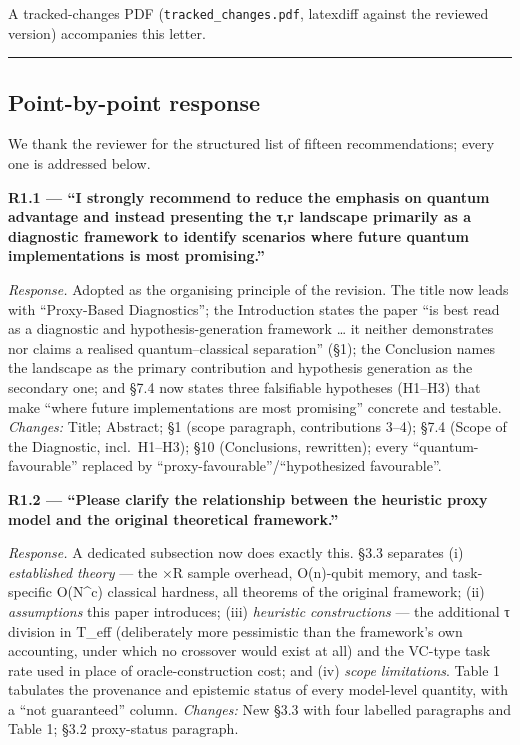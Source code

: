 \documentclass[
  11pt,
]{article}
\begin{document}
A tracked-changes PDF (\texttt{tracked\_changes.pdf}, latexdiff against
the reviewed version) accompanies this letter.

\begin{center}\rule{0.5\linewidth}{0.5pt}\end{center}

\subsection{Point-by-point response}\label{point-by-point-response}

We thank the reviewer for the structured list of fifteen
recommendations; every one is addressed below.

\textbf{R1.1 --- ``I strongly recommend to reduce the emphasis on
quantum advantage and instead presenting the τ,r landscape primarily as
a diagnostic framework to identify scenarios where future quantum
implementations is most promising.''}

\emph{Response.} Adopted as the organising principle of the revision.
The title now leads with ``Proxy-Based Diagnostics''; the Introduction
states the paper ``is best read as a diagnostic and
hypothesis-generation framework \ldots{} it neither demonstrates nor
claims a realised quantum--classical separation'' (§1); the Conclusion
names the landscape as the primary contribution and hypothesis
generation as the secondary one; and §7.4 now states three falsifiable
hypotheses (H1--H3) that make ``where future implementations are most
promising'' concrete and testable. \emph{Changes:} Title; Abstract; §1
(scope paragraph, contributions 3--4); §7.4 (Scope of the Diagnostic,
incl.~H1--H3); §10 (Conclusions, rewritten); every
``quantum-favourable'' replaced by ``proxy-favourable''/``hypothesized
favourable''.

\textbf{R1.2 --- ``Please clarify the relationship between the heuristic
proxy model and the original theoretical framework.''}

\emph{Response.} A dedicated subsection now does exactly this. §3.3
separates (i) \emph{established theory} --- the ×R sample overhead,
O(n)-qubit memory, and task-specific O(N\^{}c) classical hardness, all
theorems of the original framework; (ii) \emph{assumptions} this paper
introduces; (iii) \emph{heuristic constructions} --- the additional τ
division in T\_eff (deliberately more pessimistic than the framework's
own accounting, under which no crossover would exist at all) and the
VC-type task rate used in place of oracle-construction cost; and (iv)
\emph{scope limitations}. Table 1 tabulates the provenance and epistemic
status of every model-level quantity, with a ``not guaranteed'' column.
\emph{Changes:} New §3.3 with four labelled paragraphs and Table 1; §3.2
proxy-status paragraph.
\end{document}
